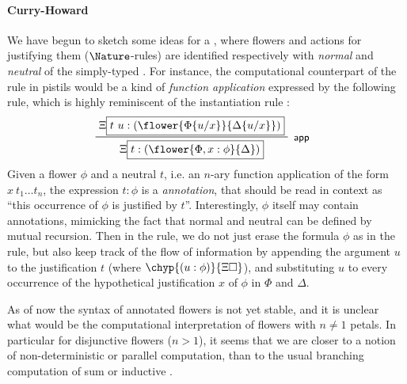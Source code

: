 \begin{scope}
\paragraph{Curry-Howard}

We have begun to sketch some ideas for a , where
flowers and \Proof actions for justifying them ($\Nature$-rules) are identified
respectively with \emph{normal} and \emph{neutral}  of the simply-typed
. For instance, the computational counterpart of the rule
 in pistils would be a kind of \emph{function application}
expressed by the following  rule, which is highly reminiscent of the
instantiation rule :
$$
\R[\rsf{app}]
  {\Xi\select{t~u : (\flower{\subst{\Phi}{u}{x}}{\subst{\Delta}{u}{x}})}}
  {\Xi\select{t : (\flower{\Phi, x : \phi}{\Delta})}}
$$
Given a flower $\phi$ and a neutral  $t$, i.e. an $n$-ary function
application of the form $x~t_1 \ldots t_n$, the expression $t : \phi$ is a
\emph{ annotation}, that should be read in context as ``this occurrence of
$\phi$ is justified by $t$''. Interestingly, $\phi$ itself may contain 
annotations, mimicking the fact that normal and neutral  can be defined by
mutual recursion. Then in the  rule, we do not just erase the formula
$\phi$ as in the  rule, but also keep track of the flow of
information by appending the argument $u$ to the justification $t$ (where
$\chyp{(u : \phi)}{\Xi\hole}$), and substituting $u$ to every occurrence of the
hypothetical justification $x$ of $\phi$ in $\Phi$ and $\Delta$.

As of now the syntax of annotated flowers is not yet stable, and it is unclear
what would be the computational interpretation of flowers with $n \not= 1$
petals. In particular for disjunctive flowers ($n > 1$), it seems that we are
closer to a notion of non-deterministic or parallel computation, than to the
usual branching computation of sum or inductive .


\end{scope}
